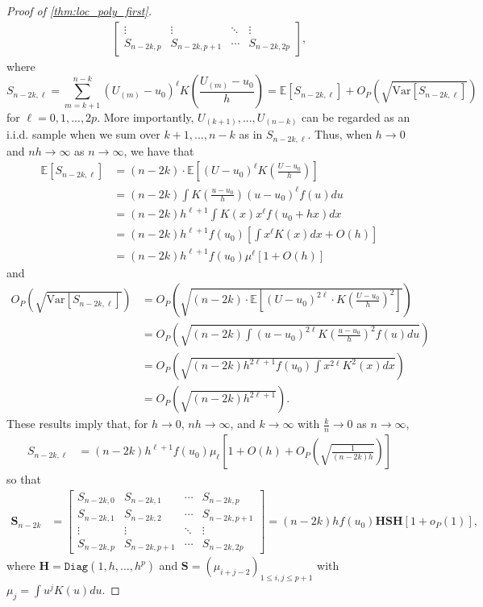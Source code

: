\documentclass{uwstat572}
\theoremstyle{definition}
\newcommand{\Diag}{\mathtt{Diag}}
\theoremstyle{theorem}
\begin{document}
\begin{proof}[Proof of \autoref{thm:loc_poly_first}]
\begin{align*}
\begin{bmatrix}
\vdots & \vdots & \ddots & \vdots\\
S_{n-2k,p} & S_{n-2k,p+1} & \cdots & S_{n-2k,2p}
\end{bmatrix},
\end{align*}
where 
$$S_{n-2k,\ell} = \sum_{m=k+1}^{n-k} \left(U_{(m)} -u_0\right)^{\ell} K\left(\frac{U_{(m)} -u_0}{h} \right) = \mathbb{E}\left[S_{n-2k,\ell}\right] + O_P\left(\sqrt{\mathrm{Var}\left[S_{n-2k,\ell}\right]}\right)$$ 
for $\ell=0,1,...,2p$. More importantly, $U_{(k+1)},...,U_{(n-k)}$ can be regarded as an i.i.d. sample when we sum over $k+1,...,n-k$ as in $S_{n-2k,\ell}$. Thus, when $h\to 0$ and $nh\to \infty$ as $n\to \infty$, we have that
\begin{align*}
\mathbb{E}\left[S_{n-2k,\ell}\right] &= (n-2k) \cdot \mathbb{E}\left[(U-u_0)^{\ell} K\left(\frac{U-u_0}{h}\right) \right]\\
&= (n-2k) \int K\left(\frac{u-u_0}{h}\right) (u-u_0)^{\ell} f(u) du\\
&= (n-2k) h^{\ell+1} \int K(x) x^{\ell} f(u_0+hx) dx\\
&= (n-2k) h^{\ell+1} f(u_0)\left[\int x^{\ell} K(x) dx + O(h)\right]\\
&= (n-2k) h^{\ell+1} f(u_0)\mu^{\ell} \left[1+ O(h)\right]
\end{align*}
and 
\begin{align*}
O_P\left(\sqrt{\mathrm{Var}\left[S_{n-2k,\ell}\right]}\right) &= O_P\left(\sqrt{(n-2k) \cdot \mathbb{E}\left[(U-u_0)^{2\ell} \cdot K\left(\frac{U-u_0}{h}\right)^2 \right]} \right)\\
&= O_P\left(\sqrt{(n-2k) \int (u-u_0)^{2\ell} K\left(\frac{u-u_0}{h}\right)^2 f(u) du} \right)\\
&= O_P\left(\sqrt{(n-2k) h^{2\ell +1} f(u_0) \int x^{2\ell} K^2(x) dx} \right)\\
&= O_P\left(\sqrt{(n-2k) h^{2\ell+1}} \right).
\end{align*}
These results imply that, for $h\to 0$, $nh\to \infty$, and $k\to \infty$ with $\frac{k}{n} \to 0$ as $n\to \infty$, 
\begin{align*}
S_{n-2k,\ell} &= (n-2k) h^{\ell +1} f(u_0) \mu_{\ell} \left[1+ O(h) + O_P\left(\sqrt{\frac{1}{(n-2k)h}}\right)\right]
\end{align*}
so that 
\begin{align*}
\bm{S}_{n-2k} &= 
\begin{bmatrix}
	S_{n-2k,0} & S_{n-2k,1} & \cdots & S_{n-2k,p}\\
	S_{n-2k,1} & S_{n-2k,2} & \cdots & S_{n-2k,p+1}\\
	\vdots & \vdots & \ddots & \vdots\\
	S_{n-2k,p} & S_{n-2k,p+1} & \cdots & S_{n-2k,2p}
\end{bmatrix} = (n-2k)h f(u_0) \bm{H}\bm{S}\bm{H}\left[1 + o_P(1)\right],
\end{align*}
where $\bm{H} = \Diag\left(1,h,...,h^p\right)$ and $\bm{S}=\left(\mu_{i+j-2}\right)_{1\leq i,j\leq p+1}$ with $\mu_j=\int u^j K(u) du$.


\end{proof}
\end{document}
